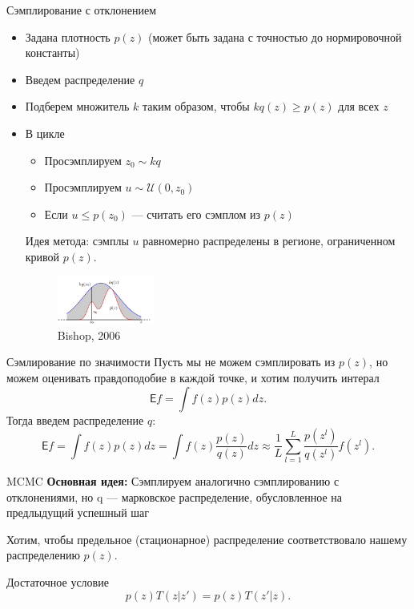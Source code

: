 \begin{frame}{Сэмплирование с отклонением}
\begin{itemize}
\item Задана плотность $p(z)$ (может быть задана с точностью до нормировочной константы)
\item Введем распределение $q$
\item Подберем множитель $k$ таким образом, чтобы $kq(z) \geq p(z)$ для всех $z$
\item В цикле
\begin{itemize}
\item Просэмплируем $z_0 \sim kq$
\item Просэмплируем $u \sim \mathcal{U}(0, z_0)$
\item Если $u \leq p(z_0)$ --- считать его сэмплом из $p(z)$
\end{itemize}

Идея метода: сэмплы $u$ равномерно распределены в регионе, ограниченном кривой $p(z)$.
\begin{figure}
\centering
\includegraphics[width=0.3\textwidth]{bishop1.png}
\\Bishop, 2006
\end{figure}

\end{itemize}
\end{frame}


\begin{frame}{Сэмлирование по значимости}
Пусть мы не можем сэмплировать из $p(z)$, но можем оценивать правдоподобие в каждой точке, и хотим получить интерал 
\[
    \mathsf{E}f = \int f(z)p(z)dz.   
\]
Тогда введем распределение $q$:
\[
    \mathsf{E}f = \int f(z)p(z)dz = \int f(z) \frac{p(z)}{q(z)}dz \approx \frac{1}{L} \sum_{l=1}^L \frac{p(z^l)}{q(z^l)}f(z^l).   
\]
\end{frame}

\begin{frame}{MCMC}
\textbf{Основная идея:}
Сэмплируем аналогично сэмплированию с отклонениями, но q --- марковское распределение, обусловленное на предлыдущий успешный шаг

Хотим, чтобы предельное (стационарное) распределение соответствовало нашему распределению $p(z)$.

Достаточное условие
\[
    p(z)T(z|z') = p(z)T(z'|z).
\]
\end{frame}


